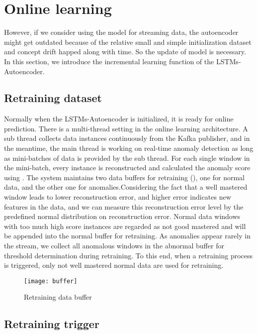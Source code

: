 \section{Online learning}
\label{sec:Onlinelearning}
However, if we consider using the model for streaming data, the autoencoder might get outdated because of the relative small and simple initialization dataset and concept drift happed along with time. So the update of model is necessary. In this section, we introduce the incremental learning function of the LSTMs-Autoencoder.

\subsection{Retraining dataset}
\label{data}

Normally when the LSTMs-Autoencoder is initialized, it is ready for online prediction. There is a multi-thread setting in the online learning architecture. A sub thread collects data instances continuously from the Kafka publisher, and in the meantime, the main thread is working on real-time anomaly detection as long as mini-batches of data is provided by the sub thread. For each single window in the mini-batch, every instance is reconstructed and calculated the anomaly score using . The system maintains two data buffers for retraining (), one for normal data, and the other one for anomalies.Considering the fact that a well mastered window leads to lower reconstruction error, and higher error indicates new features in the data, and we can measure this reconstruction error level by the predefined normal distribution on reconstruction error. Normal data windows with too much high score instances are regarded as not good mastered and will be appended into the normal buffer for retraining. As anomalies appear rarely in the stream, we collect all anomalous windows in the abnormal buffer for threshold determination during retraining. To this end, when a retraining process is triggered, only not well mastered normal data are used for retraining.

\begin{figure}[h]
\centering
\texttt{[image: buffer]}
\caption[Retraining data buffer]{Retraining data buffer}
\label{fig:buffer}
\end{figure}


\subsection{Retraining trigger}
\label{trigger}

